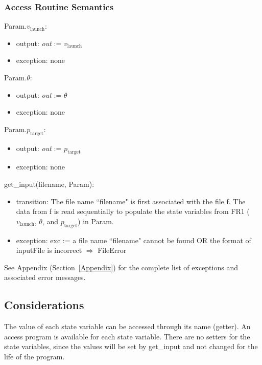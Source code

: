 \documentclass[12pt, titlepage]{article}
\begin{document}
\subsubsection{Access Routine Semantics}

\noindent Param.$v_{\text{launch}}$:
\begin{itemize}
\item output: \textit{out} := $v_{\text{launch}}$
\item exception: none
\end{itemize}

\noindent Param.$\theta$:
\begin{itemize}
\item output: \textit{out} := $\theta$
\item exception: none
\end{itemize}

\noindent Param.$p_{\text{target}}$:
\begin{itemize}
\item output: \textit{out} := $p_{\text{target}}$
\item exception: none
\end{itemize}

\noindent get\_input(filename, Param):
\begin{itemize}
\item transition: The file name ``filename" is first associated with the file f. 
The data from f is read sequentially to populate the state variables from
FR1 ($v_{\text{launch}}$, $\theta$, and $p_{\text{target}}$) in Param.
\item exception: exc := a file name ``filename" cannot be found OR the format of
inputFile is incorrect $\Rightarrow$  FileError
\end{itemize}

See Appendix (Section~\ref{Appendix}) for the complete list of exceptions and 
associated error messages.

\subsection{Considerations}

The value of each state variable can be accessed through its name (getter).  An
access program is available for each state variable.  There are no setters for
the state variables, since the values will be set by get\_input and
not changed for the life of the program.

\newpage
\end{document}
